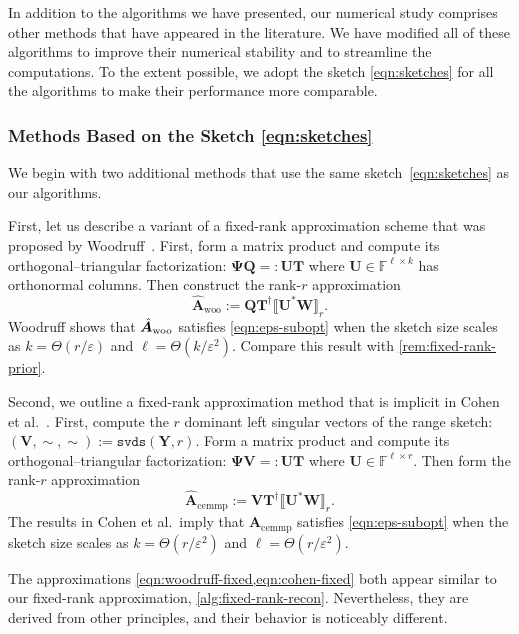 \documentclass[final]{siamart1116}
\numberwithin{equation}{section}
\numberwithin{theorem}{section}
\numberwithin{figure}{section}
\newcommand{\F}{\mathbb{F}}
\newcommand{\eps}{\varepsilon}
\newcommand{\mtx}[1]{\bm{#1}}
\newcommand{\lowrank}[2]{\llbracket {#1} \rrbracket_{#2}}
\begin{document}
In addition to the algorithms we have presented,
our numerical study comprises other methods that have appeared in the literature.  We have modified
all of these algorithms to improve their numerical
stability and to streamline the computations.
To the extent possible, we adopt
the sketch \cref{eqn:sketches} for all the algorithms to
make their performance more comparable.

\subsubsection{Methods Based on the Sketch \cref{eqn:sketches}}

We begin with two additional methods that use
the same sketch~\cref{eqn:sketches} as our algorithms.

First, let us describe a variant of a fixed-rank approximation scheme that
was proposed by Woodruff~\cite[Thm.~4.3, display 2]{Woo14:Sketching-Tool}.
First, form a matrix product and compute its orthogonal--triangular factorization:
$\mtx{\Psi Q} =: \mtx{UT}$ where $\mtx{U} \in \F^{\ell \times k}$
has orthonormal columns.
Then construct the rank-$r$ approximation
\begin{equation} \label{eqn:woodruff-fixed}
\hat{\mtx{A}}_{\mathrm{woo}}
	:= \mtx{Q} \mtx{T}^{\dagger} \lowrank{\mtx{U}^*\mtx{W}}{r}.
\end{equation}
Woodruff shows that $\hat{\mtx{A}}_{\rm woo}$ satisfies \cref{eqn:eps-subopt}
when the sketch size scales as $k = \Theta(r/\eps)$
and $\ell = \Theta(k/\eps^2)$.
Compare this result with \cref{rem:fixed-rank-prior}.

Second, we outline a fixed-rank approximation method that
is implicit in Cohen et al.~\cite[Sec.~10.1]{CEM+15:Dimensionality-Reduction}.
First, compute the $r$ dominant left singular vectors
of the range sketch: $(\mtx{V}, \sim, \sim) := \texttt{svds}(\mtx{Y}, r)$.
Form a matrix product and compute its orthogonal--triangular factorization:
$\mtx{\Psi V} =: \mtx{UT}$ where $\mtx{U} \in \F^{\ell \times r}$.
Then form the rank-$r$ approximation
\begin{equation} \label{eqn:cohen-fixed}
\hat{\mtx{A}}_{\mathrm{cemmp}}
	:= \mtx{V} \mtx{T}^{\dagger} \lowrank{\mtx{U}^*\mtx{W}}{r}.
\end{equation}
The results in Cohen et al.~imply that $\hat{\mtx{A}}_{\mathrm{cemmp}}$
satisfies \cref{eqn:eps-subopt} when the sketch size scales
as $k = \Theta(r/\eps^2)$ and $\ell = \Theta(r/\eps^2)$.

The approximations \cref{eqn:woodruff-fixed,eqn:cohen-fixed} both appear
similar to our fixed-rank approximation, \cref{alg:fixed-rank-recon}. Nevertheless, they are derived from other principles,
and their behavior is noticeably different.
\end{document}
